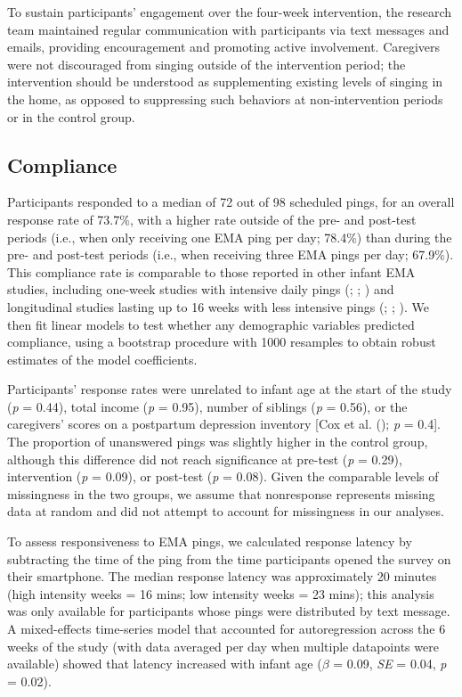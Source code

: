 \documentclass[
]{article}
\begin{document}
To sustain participants' engagement over the four-week intervention, the
research team maintained regular communication with participants via
text messages and emails, providing encouragement and promoting active
involvement. Caregivers were not discouraged from singing outside of the
intervention period; the intervention should be understood as
supplementing existing levels of singing in the home, as opposed to
suppressing such behaviors at non-intervention periods or in the control
group.

\subsection{Compliance}\label{compliance}

Participants responded to a median of 72 out of 98 scheduled pings, for
an overall response rate of 73.7\%, with a higher rate outside of the
pre- and post-test periods (i.e., when only receiving one EMA ping per
day; 78.4\%) than during the pre- and post-test periods (i.e., when
receiving three EMA pings per day; 67.9\%). This compliance rate is
comparable to those reported in other infant EMA studies, including
one-week studies with intensive daily pings
(;
;
) and longitudinal studies
lasting up to 16 weeks with less intensive pings
(;
;
). We then fit linear
models to test whether any demographic variables predicted compliance,
using a bootstrap procedure with 1000 resamples to obtain robust
estimates of the model coefficients.

Participants' response rates were unrelated to infant age at the start
of the study (\emph{p} = 0.44), total income (\emph{p} = 0.95), number
of siblings (\emph{p} = 0.56), or the caregivers' scores on a postpartum
depression inventory {[}Cox et al. ();
\emph{p} = 0.4{]}. The proportion of unanswered pings was slightly
higher in the control group, although this difference did not reach
significance at pre-test (\emph{p} = 0.29), intervention (\emph{p} =
0.09), or post-test (\emph{p} = 0.08). Given the comparable levels of
missingness in the two groups, we assume that nonresponse represents
missing data at random and did not attempt to account for missingness in
our analyses.

To assess responsiveness to EMA pings, we calculated response latency by
subtracting the time of the ping from the time participants opened the
survey on their smartphone. The median response latency was
approximately 20 minutes (high intensity weeks = 16 mins; low intensity
weeks = 23 mins); this analysis was only available for participants
whose pings were distributed by text message. A mixed-effects
time-series model that accounted for autoregression across the 6 weeks
of the study (with data averaged per day when multiple datapoints were
available) showed that latency increased with infant age (\(\beta\) =
0.09, \emph{SE} = 0.04, \emph{p} = 0.02).
\end{document}
